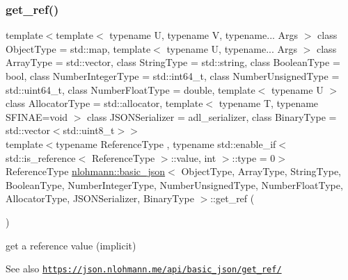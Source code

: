 \subsubsection{\texorpdfstring{get\+\_\+ref()}{get\_ref()}\hspace{0.1cm}{\footnotesize\ttfamily [1/2]}}
{\footnotesize\ttfamily template$<$template$<$ typename U, typename V, typename... Args $>$ class Object\+Type = std\+::map, template$<$ typename U, typename... Args $>$ class Array\+Type = std\+::vector, class String\+Type  = std\+::string, class Boolean\+Type  = bool, class Number\+Integer\+Type  = std\+::int64\+\_\+t, class Number\+Unsigned\+Type  = std\+::uint64\+\_\+t, class Number\+Float\+Type  = double, template$<$ typename U $>$ class Allocator\+Type = std\+::allocator, template$<$ typename T, typename S\+F\+I\+N\+A\+E=void $>$ class J\+S\+O\+N\+Serializer = adl\+\_\+serializer, class Binary\+Type  = std\+::vector$<$std\+::uint8\+\_\+t$>$$>$ \\
template$<$typename Reference\+Type , typename std\+::enable\+\_\+if$<$ std\+::is\+\_\+reference$<$ Reference\+Type $>$\+::value, int $>$\+::type  = 0$>$ \\
Reference\+Type \hyperlink{classnlohmann_1_1basic__json}{nlohmann\+::basic\+\_\+json}$<$ Object\+Type, Array\+Type, String\+Type, Boolean\+Type, Number\+Integer\+Type, Number\+Unsigned\+Type, Number\+Float\+Type, Allocator\+Type, J\+S\+O\+N\+Serializer, Binary\+Type $>$\+::get\+\_\+ref (\begin{DoxyParamCaption}{ }\end{DoxyParamCaption})\hspace{0.3cm}{\ttfamily [inline]}}



get a reference value (implicit) 

\begin{DoxySeeAlso}{See also}
\href{https://json.nlohmann.me/api/basic_json/get_ref/}{\tt https\+://json.\+nlohmann.\+me/api/basic\+\_\+json/get\+\_\+ref/} 
\end{DoxySeeAlso}
\mbox{\label{classnlohmann_1_1basic__json_a7f0889072c54f1b899689ed6246238e7}} 
